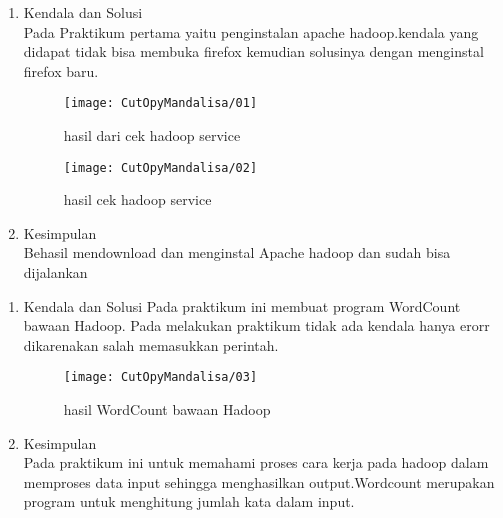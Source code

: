 
\begin{enumerate}
\item Kendala dan Solusi\\
Pada Praktikum pertama yaitu penginstalan apache hadoop.kendala yang didapat tidak bisa membuka firefox kemudian solusinya dengan menginstal firefox baru.

\begin{figure}[!ht]
\texttt{[image: CutOpyMandalisa/01]}
\caption{hasil dari cek hadoop service}
\label{gam:perkuliahan-25-11}
\end{figure}

\begin{figure}[!ht]
\texttt{[image: CutOpyMandalisa/02]}
\caption{hasil cek hadoop service}
\label{gam:perkuliahan-25-11}
\end{figure}

\item Kesimpulan\\
Behasil mendownload dan menginstal Apache hadoop dan sudah bisa dijalankan
\end{enumerate}


\begin{enumerate}

\item Kendala dan Solusi
\newpage
Pada praktikum ini membuat program WordCount bawaan Hadoop. Pada melakukan praktikum tidak ada kendala hanya erorr dikarenakan salah memasukkan perintah.

\begin{figure}[!ht]
\texttt{[image: CutOpyMandalisa/03]}
\caption{hasil WordCount bawaan Hadoop}
\label{gam:perkuliahan-25-11}
\end{figure}

\item Kesimpulan\\
Pada praktikum ini untuk memahami proses cara kerja pada hadoop dalam memproses data input sehingga menghasilkan output.Wordcount merupakan program untuk menghitung jumlah kata dalam input.
\end{enumerate}


